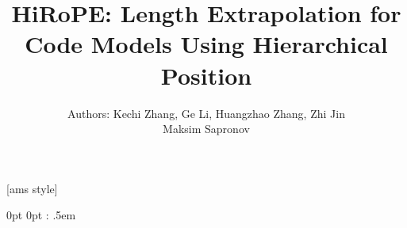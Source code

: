 \newcommand{\NN}{\mathbb{N}}
\newcommand{\ZZ}{\mathbb{Z}}
\newcommand{\QQ}{\mathbb{Q}}
\newcommand{\RR}{\mathbb{R}}
\newcommand{\eRR}{\overline{\mathbb{R}}}
\newcommand{\pinfty}{+\infty}
\newcommand{\minfty}{-\infty}
\newcommand{\bigO}{\mathcal{O}}
\newcommand{\bigOmg}{\Omega}
\newcommand{\bigomg}{\omega}
\newcommand{\bigth}{\Theta}
\newcommand{\bigo}{o}
\newcommand{\ee}{\mathrm{e}}
\newcommand{\diag}{\mathrm{diag}}

\newcommand{\vx}{\mathbf{x}}
\newcommand{\vy}{\mathbf{y}}
\newcommand{\vz}{\mathbf{z}}
\newcommand{\va}{\mathbf{a}}
\newcommand{\vb}{\mathbf{b}}
\newcommand{\vc}{\mathbf{c}}
\newcommand{\ve}{\mathbf{e}}
\newcommand{\vs}{\mathbf{s}}

\newcommand{\mA}{\mathbf{A}}
\newcommand{\mB}{\mathbf{B}}
\newcommand{\mC}{\mathbf{C}}
\newcommand{\mD}{\mathbf{D}}
\newcommand{\mE}{\mathbf{E}}
\newcommand{\mM}{\mathbf{M}}
\newcommand{\mP}{\mathbf{P}}

\newcommand{\grad}{\mathrm{grad}}
\DeclareMathOperator*{\cart}{\scalebox{2}{\times}}



[ams style]


\title[HiRoPE]{HiRoPE: Length Extrapolation for Code Models Using Hierarchical Position}
\author[Maksim Sapronov]{%
    Authors: Kechi Zhang, Ge Li, Huangzhao Zhang, Zhi Jin \\
    \bigskip
    Maksim Sapronov
}
\date{}

%
	{0pt}%
	{0pt}%
	{\normalfont}%
	{}%
	{\bfseries}%
	{:}%
	{.5em}%
	{}%

\theoremstyle{presentation}
\newtheorem*{defi}{Definition}

